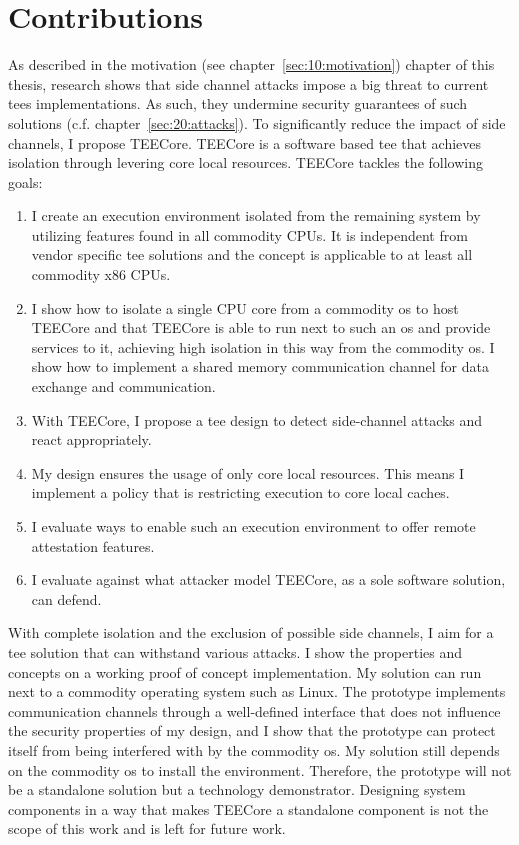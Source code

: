 \section{Contributions}
\label{sec:10:contributions}
As described in the motivation (see chapter~\ref{sec:10:motivation}) chapter of
this thesis, research shows that side channel attacks impose a big threat to
current \glspl{tee} implementations. As such, they undermine security guarantees
of such solutions (c.f. chapter~\ref{sec:20:attacks}). To significantly reduce
the impact of side channels, I propose TEECore. TEECore is a software based
\gls{tee} that achieves isolation through levering core local resources. TEECore
tackles the following goals:

\begin{enumerate}
  \item I create an execution environment isolated from the remaining system by
    utilizing features found in all commodity CPUs. It is independent from
    vendor specific \gls{tee} solutions and the concept is applicable to at
    least all commodity x86 CPUs.
  \item I show how to isolate a single CPU core from a commodity \gls{os} to
    host TEECore and that TEECore is able to run next to such an \gls{os} and
    provide services to it, achieving high isolation in this way from the
    commodity \gls{os}. I show how to implement a shared memory communication
    channel for data exchange and communication.
  \item With TEECore, I propose a \gls{tee} design to detect side-channel
    attacks and react appropriately.
  \item My design ensures the usage of only core local resources. This means I
    implement a policy that is restricting execution to core local caches.
  \item I evaluate ways to enable such an execution environment to offer
    remote attestation features.
  \item I evaluate against what attacker model TEECore, as a sole software
    solution, can defend.
\end{enumerate}

With complete isolation and the exclusion of possible side channels, I aim for a
\gls{tee} solution that can withstand various attacks. I show the properties and
concepts on a working proof of concept implementation. My solution can run next
to a commodity operating system such as Linux. The prototype implements
communication channels through a well-defined interface that does not influence
the security properties of my design, and I show that the prototype can protect
itself from being interfered with by the commodity \gls{os}. My solution still
depends on the commodity \gls{os} to install the environment. Therefore, the
prototype will not be a standalone solution but a technology demonstrator.
Designing system components in a way that makes TEECore a standalone component
is not the scope of this work and is left for future work.

